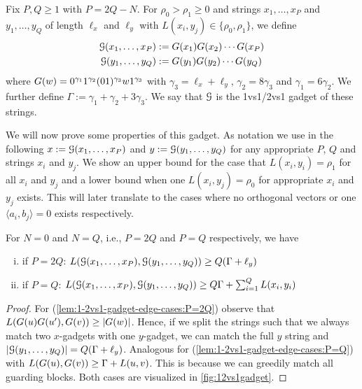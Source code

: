 \begin{definition}[1vs1/2vs1 Gadget]
Fix $P, Q \geq 1$ with $P = 2Q - N$.
For $\rho_0 > \rho_1 \geq 0$ and strings $x_1, \ldots, x_P$ and $y_1, \ldots, y_Q$ of length $\ell_x$ and $\ell_y$ with $L(x_i, y_j) \in \{\rho_0, \rho_1\}$, we define
\begin{align*}
	\mathcal{G}(x_1, \ldots, x_P) &:= G(x_1)G(x_2) \cdots G(x_P)\\
	\mathcal{G}(y_1, \ldots, y_Q) &:= G(y_1)G(y_2) \cdots G(y_Q)
\end{align*}
where $G(w) = 0^{\gamma_1}1^{\gamma_2}(01)^{\gamma_3}w1^{\gamma_3}$ with $\gamma_3 = \ell_x + \ell_y$, $\gamma_2 = 8\gamma_3$ and $\gamma_1 = 6\gamma_2$.
We further define $\Gamma := \gamma_1 + \gamma_2 + 3\gamma_3$.
We say that $\mathcal{G}$ is the 1vs1/2vs1 gadget of these strings.
\end{definition}

We will now prove some properties of this gadget.
As notation we use in the following $x := \mathcal{G}(x_1, \ldots, x_P)$ and $y := \mathcal{G}(y_1, \ldots, y_Q)$ for any appropriate $P$, $Q$ and strings $x_i$ and $y_j$.
We show an upper bound for the case that $L(x_i, y_i) = \rho_1$ for all $x_i$ and $y_j$ and a lower bound when one $L(x_i, y_j) = \rho_0$ for appropriate $x_i$ and $y_j$ exists.
This will later translate to the cases where no orthogonal vectors or one $\langle a_i, b_j \rangle = 0$ exists respectively.


\begin{lemma}
\label{lem:1-2vs1-gadget-edge-cases}
For $N = 0$ and $N = Q$, i.e., $P = 2Q$ and $P = Q$ respectively, we have
\begin{enumerate}[(i)]
\item\label{lem:1-2vs1-gadget-edge-cases:P=2Q} if $P = 2Q$: $L(\mathcal{G}(x_1, \ldots, x_P), \mathcal{G}(y_1, \ldots, y_Q)) \geq Q(\Gamma + \ell_y)$
\item\label{lem:1-2vs1-gadget-edge-cases:P=Q} if $P = Q$: $L(\mathcal{G}(x_1, \ldots, x_P), \mathcal{G}(y_1, \ldots, y_Q)) \geq Q\Gamma + \sum_{i = 1}^{Q} L(x_i, y_i)$
\end{enumerate}
\end{lemma}
\begin{proof}
For (\ref{lem:1-2vs1-gadget-edge-cases:P=2Q}) observe that $L(G(u)G(u'), G(v)) \geq |G(w)|$.
Hence, if we split the strings such that we always match two $x$-gadgets with one $y$-gadget, we can match the full $y$ string and $|\mathcal{G}(y_1, \ldots, y_Q)| = Q(\Gamma + \ell_y)$.
Analogous for (\ref{lem:1-2vs1-gadget-edge-cases:P=Q}) with $L(G(u), G(v)) \geq \Gamma + L(u,v)$.
This is because we can greedily match all guarding blocks.
Both cases are visualized in \autoref{fig:12vs1gadget}.
\end{proof}

